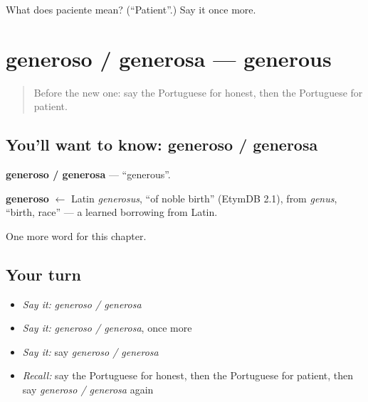 \begin{tcolorbox}[breakable,colback=teal!4,colframe=teal!35!black,title={Before you move on}]
What does paciente mean? (\textquotedblleft{}Patient\textquotedblright{}.) Say it once more.
\end{tcolorbox}
\section[generoso / generosa]{generoso / generosa — generous}

\label{lesson:PT-C155-generoso-generosa}



\begin{quote}
Before the new one: say the Portuguese for honest, then the Portuguese for patient.
\end{quote}

\subsection*{You'll want to know: generoso / generosa}
\textbf{generoso / generosa} — \textquotedblleft{}generous\textquotedblright{}.

\begin{cousinweb}
\textbf{generoso} $\leftarrow$ Latin \emph{generosus}, \textquotedblleft{}of noble birth\textquotedblright{} (EtymDB 2.1), from \emph{genus}, \textquotedblleft{}birth, race\textquotedblright{} — a learned borrowing from Latin.
\end{cousinweb}

\begin{grammarlens}[title={What you've built}]
One more word for this chapter.
\end{grammarlens}

\subsection*{Your turn}
\begin{itemize}
\raggedright
  \item \emph{Say it:} \emph{generoso / generosa}
  \item \emph{Say it:} \emph{generoso / generosa}, once more
  \item \emph{Say it:} say \emph{generoso / generosa}
  \item \emph{Recall:} say the Portuguese for honest, then the Portuguese for patient, then say \emph{generoso / generosa} again
\end{itemize}

